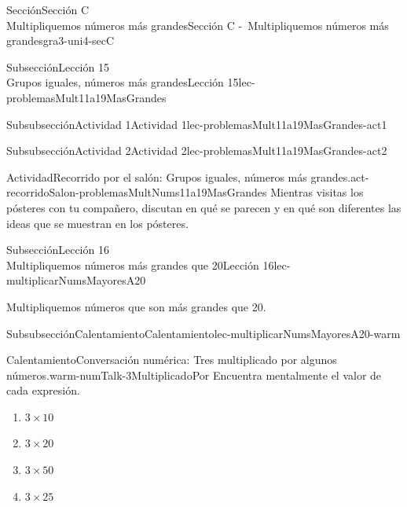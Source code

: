 \begin{sectionptx}{Sección}{{\Large Sección C\\}Multipliquemos números más grandes}{}{Sección C -~Multipliquemos números más grandes}{}{}{gra3-uni4-secC}
\begin{subsectionptx}{Subsección}{{\normalsize Lección 15\\[-0.05cm]}Grupos iguales, números más grandes}{}{Lección 15}{}{}{lec-problemasMult11a19MasGrandes}
\begin{subsubsectionptx}{Subsubsección}{Actividad 1}{}{Actividad 1}{}{}{lec-problemasMult11a19MasGrandes-act1}
\end{subsubsectionptx}
%
%
\typeout{************************************************}
\typeout{************************************************}
%
\begin{subsubsectionptx}{Subsubsección}{Actividad 2}{}{Actividad 2}{}{}{lec-problemasMult11a19MasGrandes-act2}
\begin{activity}{Actividad}{Recorrido por el salón: Grupos iguales, números más grandes.}{act-recorridoSalon-problemasMultNums11a19MasGrandes}%
Mientras visitas los pósteres con tu compañero, discutan en qué se parecen y en qué son diferentes las ideas que se muestran en los pósteres.%
\end{activity}%
\end{subsubsectionptx}
\end{subsectionptx}
%
%
\typeout{************************************************}
\typeout{************************************************}
%
\begin{subsectionptx}{Subsección}{{\normalsize Lección 16\\[-0.05cm]}Multipliquemos números más grandes que 20}{}{Lección 16}{}{}{lec-multiplicarNumsMayoresA20}
\begin{introduction}{}%
Multipliquemos números que son más grandes que 20.%
\end{introduction}%
%
%
\typeout{************************************************}
\typeout{************************************************}
%
\begin{subsubsectionptx}{Subsubsección}{Calentamiento}{}{Calentamiento}{}{}{lec-multiplicarNumsMayoresA20-warm}
\begin{exploration}{Calentamiento}{Conversación numérica: Tres multiplicado por algunos números.}{warm-numTalk-3MultiplicadoPor}%
Encuentra mentalmente el valor de cada expresión.%
%
\begin{enumerate}[label={\Alph*.}]
\item{}\(\displaystyle 3\times 10\)%
\item{}\(\displaystyle 3\times 20\)%
\item{}\(\displaystyle 3\times 50\)%
\item{}\(\displaystyle 3\times 25\)%
\end{enumerate}
\end{exploration}%
\end{subsubsectionptx}
%

\end{subsectionptx}
\end{sectionptx}
